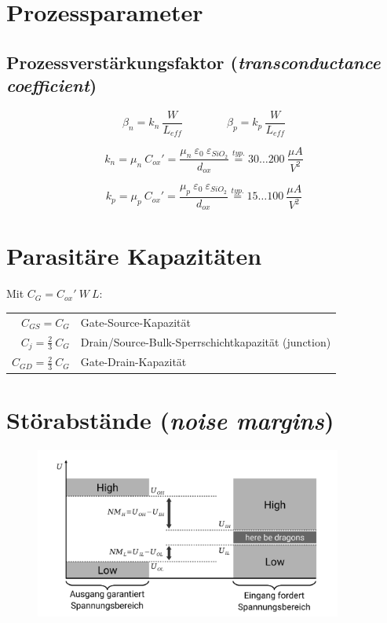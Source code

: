 \documentclass[a4paper,11pt]{article}
\begin{document}
\section*{Prozessparameter}
\subsection*{Prozessverstärkungsfaktor (\textit{transconductance coefficient})}
\[
	\boxed { \quad \beta_n = k_n ~ \frac{W}{L_{eff}} \quad } \qquad \boxed { \quad \beta_p = k_p ~ \frac{W}{L_{eff}} \quad }
\]

\[
	k_n = \mu_n ~ C_{ox}' = \frac{\mu_n ~ \varepsilon_0 ~ \varepsilon_{SiO_2}}{d_{ox}} \stackrel{typ.}{=} 30 \ldots 200 ~ \frac{\mu A}{V^2}
\]

\[
	k_p = \mu_p ~ C_{ox}' = \frac{\mu_p ~ \varepsilon_0 ~ \varepsilon_{SiO_2}}{d_{ox}} \stackrel{typ.}{=} 15 \ldots 100 ~ \frac{\mu A}{V^2}
\]

\section*{Parasitäre Kapazitäten}
Mit $C_G = C_{ox}' ~ W ~ L$:

\begin{center}
\begin{tabular}{r l}
	$C_{GS} = C_G$ & Gate-Source-Kapazität \\
	$C_j = \frac{2}{3} ~ C_G$ & Drain/Source-Bulk-Sperrschichtkapazität (junction) \\
	$C_{GD} = \frac{2}{3} ~ C_G$ & Gate-Drain-Kapazität
\end{tabular}
\end{center}

\section*{Störabstände (\textit{noise margins})}
\begin{figure}[H]
\begin{center}
	\includegraphics[width=0.9\textwidth]{img/noisemargin.pdf}
\end{center}
\end{figure}
\end{document}
